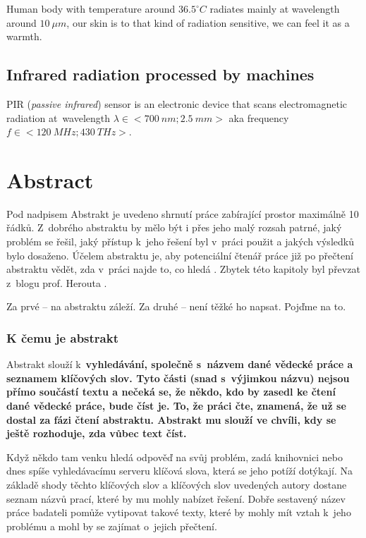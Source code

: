 Human body with temperature around $36.5^\circ C$ radiates mainly at wavelength around $10~\mu m$,
our skin is to that kind of radiation sensitive, we can feel it as a warmth.

\section{Infrared radiation processed by machines}
PIR ({\it passive infrared}) sensor is an electronic device that scans electromagnetic
radiation at~wavelength $\lambda\in<700~nm;2.5~mm>$ aka frequency $f\in<120~MHz;430~THz>$.



\chapter{Abstract}
\label{abstract}
Pod nadpisem Abstrakt je uvedeno shrnutí práce zabírající prostor maximálně 10 řádků. Z~dobrého abstraktu by mělo být i přes jeho malý rozsah patrné, jaký problém se řešil, jaký přístup k~jeho řešení byl v~práci použit a jakých výsledků bylo dosaženo. Účelem abstraktu je, aby potenciální čtenář práce již po přečtení abstraktu vědět, zda v~práci najde to, co hledá \cite{fitWeb}. Zbytek této kapitoly byl převzat z~blogu prof. Herouta \cite{Herout}.
\bigskip

\noindent Za prvé – na abstraktu záleží. Za druhé – není těžké ho napsat. Pojďme na to.

\subsection*{K čemu je abstrakt}
Abstrakt slouží k~\bf vyhledávání\rm, společně s~názvem dané vědecké práce a seznamem klíčových slov. Tyto části (snad s~výjimkou názvu) nejsou přímo součástí textu a nečeká se, že někdo, kdo by zasedl ke čtení dané vědecké práce, bude číst je. To, že práci čte, znamená, že už se dostal za fázi čtení abstraktu. Abstrakt mu slouží ve chvíli, kdy se ještě rozhoduje, \bf zda vůbec \rm text číst.

Když někdo tam venku hledá odpověď na svůj problém, zadá knihovnici nebo dnes spíše vyhledávacímu serveru klíčová slova, která se jeho potíží dotýkají. Na základě shody těchto klíčových slov a klíčových slov uvedených autory dostane seznam názvů prací, které by mu mohly nabízet řešení. Dobře sestavený název práce badateli pomůže vytipovat takové texty, které by mohly mít vztah k~jeho problému a mohl by se zajímat o~jejich přečtení.


